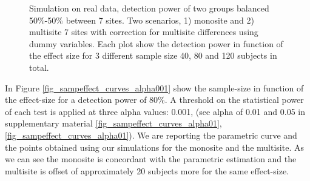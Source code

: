 \documentclass[authoryear]{elsarticle}
\begin{document}
\begin{figure}[tbp]
\centering
\captionsetup[subfloat]{labelformat=empty}
\hspace{1mm}
\hspace{1mm}
\hspace{1mm}
\caption{
Simulation on real data, detection power of two groups balanced 50\%-50\% between 7 sites. Two scenarios, 1) monosite and 2) multisite 7 sites with correction for multisite differences using dummy variables. Each plot show the detection power in function of the effect size for 3 different sample size 40, 80 and 120 subjects in total.
}
\label{fig_real_sim_samplesize}
\end{figure}

In Figure \ref{fig_sampeffect_curves_alpha001} show the sample-size in function of the effect-size for a detection power of 80\%. A threshold on the statistical power of each test is applied at three alpha values: 0.001, (see alpha of 0.01 and 0.05 in supplementary material \ref{fig_sampeffect_curves_alpha01},\ref{fig_sampeffect_curves_alpha01}). We are reporting the parametric curve and the points obtained using our simulations for the monosite and the multisite. As we can see the monosite is concordant with the parametric estimation and the multisite is offset of approximately 20 subjects more for the same effect-size.
\end{document}
